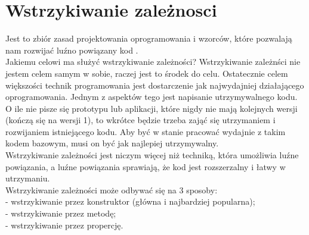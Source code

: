 \documentclass[12pt]{article}
\begin{document}
\clearpage

\section{Wstrzykiwanie zależnosci}
Jest to zbiór zasad projektowania oprogramowania i wzorców, które pozwalają nam rozwijać luźno powiązany kod \cite{dependency_injection}.\\
Jakiemu celowi ma służyć wstrzykiwanie zależności? Wstrzykiwanie zależnści nie jestem celem samym w sobie, raczej jest to środek do celu. Ostatecznie celem większości technik programowania jest dostarczenie jak najwydajniej działającego oprogramowania. Jednym z aspektów tego jest napisanie utrzymywalnego kodu.\\
O ile nie pisze się prototypu lub aplikacji, które nigdy nie mają kolejnych wersji (kończą się na wersji 1), to wkrótce będzie trzeba zająć się utrzymaniem i rozwijaniem istniejącego kodu. Aby być w stanie pracować wydajnie z takim kodem bazowym, musi on być jak najlepiej utrzymywalny.\\
Wstrzykiwanie zależności jest niczym więcej niż techniką, która umożliwia luźne powiązania, a luźne powiązania sprawiają, że kod jest rozszerzalny i łatwy w utrzymaniu. \cite{dependency_injection}\\
Wstrzykiwanie zależności może odbywać się na 3 sposoby:\\
- wstrzykiwanie przez konstruktor (główna i najbardziej popularna);\\
- wstrzykiwanie przez metodę;\\
- wstrzykiwanie przez propercję.\\
\end{document}
